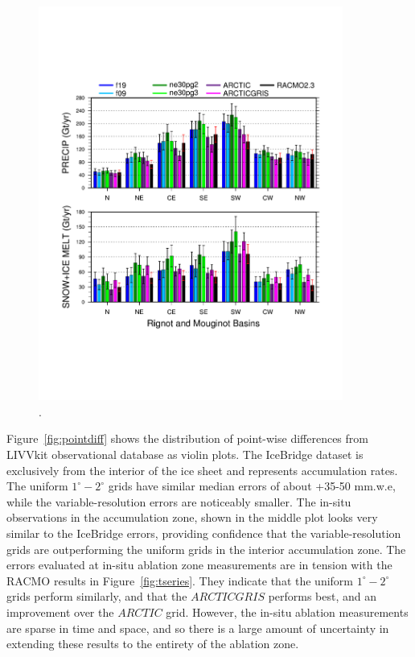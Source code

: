 \documentclass[draft]{agujournal2019}
\begin{document}
\begin{figure}[t]
\begin{center}
         \includegraphics[width=100mm]{figs/temp_tseries_BASIN.pdf}
\end{center}
\caption{.}
\label{fig:basin}
\end{figure}

Figure~\ref{fig:pointdiff} shows the distribution of point-wise differences from LIVVkit observational database as violin plots. The IceBridge dataset is exclusively from the interior of the ice sheet and represents accumulation rates. The uniform $1^{\circ}-2^{\circ}$ grids have similar median errors of about +35-50 mm.w.e, while the variable-resolution errors are noticeably smaller. The in-situ observations in the accumulation zone, shown in the middle plot looks very similar to the IceBridge errors, providing confidence that the variable-resolution grids are outperforming the uniform grids in the interior accumulation zone. The errors evaluated at in-situ ablation zone measurements are in tension with the RACMO results in Figure~\ref{fig:tseries}. They indicate that the uniform $1^{\circ}-2^{\circ}$ grids perform similarly, and that the $ARCTICGRIS$ performs best, and an improvement over the $ARCTIC$ grid. However, the in-situ ablation measurements are sparse in time and space, and so there is a large amount of uncertainty in extending these results to the entirety of the ablation zone.
\end{document}
